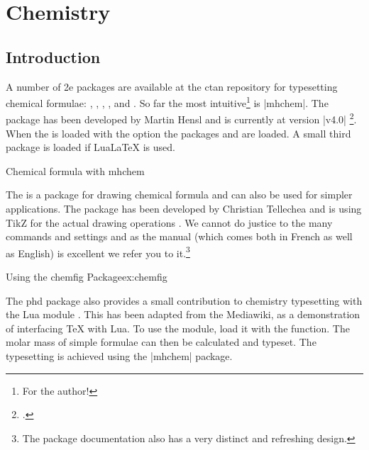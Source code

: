 \chapter{Chemistry}

\section{Introduction}

A number of \latex2e packages are available at the ctan repository for typesetting chemical formulae: , , ,  \cite{xymtex},  and  . So far the most intuitive\footnote{For the author!} is |mhchem|. The package has been developed by Martin Hensl and is currently at version |v4.0| \footcite{mhchem}. When the  is loaded with the option  the packages  and  are loaded. A small third package is loaded if LuaLaTeX is used. 

\begin{texexample}{Chemical formula with mhchem}{}
\end{texexample}

The  is a package for drawing chemical formula and can also be used for simpler applications. The package has been developed by Christian Tellechea and is using TikZ for the actual drawing operations \cite{chemfig}. We cannot do justice to the many commands and settings and as the manual (which comes both in French as well as English) is excellent we refer you to it.\footnote{The package documentation also has a very distinct and refreshing design.}

\begin{texexample}{Using the chemfig Package}{ex:chemfig}
\end{texexample}

The phd package also provides a small contribution to chemistry typesetting with the Lua module . This has been adapted from the Mediawiki, as a demonstration of interfacing TeX with Lua. To use the module, load it with the  function. The molar mass of simple formulae can then be calculated and typeset. The typesetting is achieved using the |mhchem| package.

